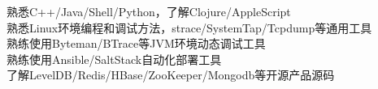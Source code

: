 

\begin{cvparagraph}

熟悉C++/Java/Shell/Python，了解Clojure/AppleScript\\
熟悉Linux环境编程和调试方法，strace/SystemTap/Tcpdump等通用工具\\
熟练使用Byteman/BTrace等JVM环境动态调试工具\\
熟练使用Ansible/SaltStack自动化部署工具\\
了解LevelDB/Redis/HBase/ZooKeeper/Mongodb等开源产品源码\\
\end{cvparagraph}
